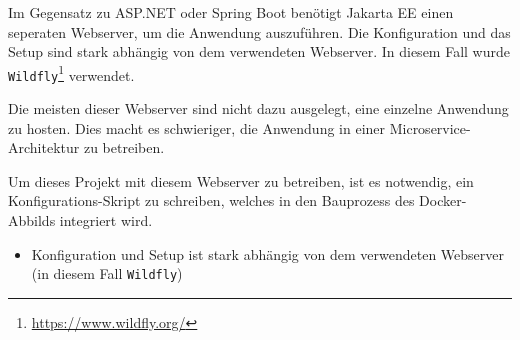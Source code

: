 Im Gegensatz zu ASP.NET oder Spring Boot benötigt Jakarta EE einen seperaten Webserver, um die Anwendung auszuführen. 
Die Konfiguration und das Setup sind stark abhängig von dem verwendeten Webserver. 
In diesem Fall wurde \texttt{Wildfly}\footnote{\url{https://www.wildfly.org/}} verwendet.

Die meisten dieser Webserver sind nicht dazu ausgelegt, eine einzelne Anwendung zu hosten.
Dies macht es schwieriger, die Anwendung in einer Microservice-Architektur zu betreiben.

Um dieses Projekt mit diesem Webserver zu betreiben, ist es notwendig, ein Konfigurations-Skript zu schreiben, welches in den Bauprozess des Docker-Abbilds integriert wird.

\begin{itemize}
    \item Konfiguration und Setup ist stark abhängig von dem verwendeten Webserver (in diesem Fall \texttt{Wildfly})
\end{itemize}

